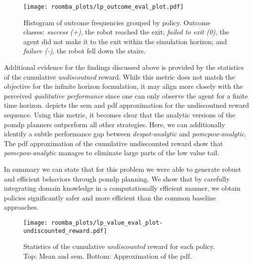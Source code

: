 \begin{figure}[htpb]
  \centering
  \texttt{[image: roomba\_plots/lp\_outcome\_eval\_plot.pdf]}
	\caption{Histogram of outcome frequencies grouped by policy. Outcome
			     classes: \emph{success (+)}, the robot reached the exit; \emph{failed to
				   exit (0)}, the agent did not make it to the exit within the simulation horizon;
		 	 	   and \emph{failure (-)}, the robot fell down the stairs.}
	\label{fig:lp_outcome}
\end{figure}

Additional evidence for the findings discussed above is provided by the
statistics of the cumulative \emph{undiscoutned} reward. While this metric does
not match the objective for the infinite horizon formulation, it may align more closely with the
perceived \emph{qualitative performance} since one can only observe the agent
for a finite time horizon.  depicts the \ac{sem}
and \ac{pdf} approximation for the undiscoutned reward sequence. Using this
metric, it becomes clear that the analytic versions of the \ac{pomdp} planners
outperform all other strategies. Here, we can additionally identify a subtle
performance gap between \emph{\ac{despot}-analytic} and
\emph{\ac{pomcpow}-analytic}. The \ac{pdf} approximation of the
cumulative undiscounted reward show that \emph{\ac{pomcpow}-analytic} manages
to eliminate large parts of the low value tail.

In summary we can state that for this problem we were able to generate robust
and efficient behaviors through \ac{pomdp} planning. We show that by carefully
integrating domain knowledge in a computationally efficient manner, we obtain
policies significantly safer and more efficient than the common baseline
approaches.

\begin{figure}[htpb]
  \centering
  \texttt{[image: roomba\_plots/lp\_value\_eval\_plot-undiscounted\_reward.pdf]}
  \caption{Statistics of the cumulative \emph{undiscounted} reward for each
  policy. Top: Mean and \acf{sem}. Bottom: Approximation of the \acf{pdf}.}
  \label{fig:lp_eval_undiscounted}
\end{figure}

